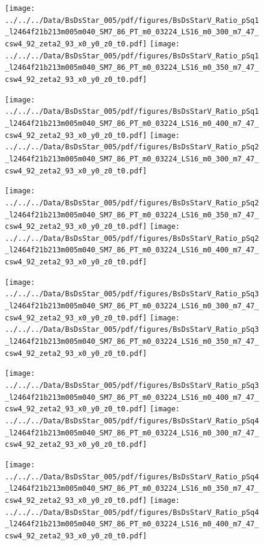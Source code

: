 \documentclass[a4paper,10pt]{article}
\begin{document}
\begin{figure}[p]
 \texttt{[image: ../../../Data/BsDsStar\_005/pdf/figures/BsDsStarV\_Ratio\_pSq1\_l2464f21b213m005m040\_SM7\_86\_PT\_m0\_03224\_LS16\_m0\_300\_m7\_47\_csw4\_92\_zeta2\_93\_x0\_y0\_z0\_t0.pdf]} 
 \texttt{[image: ../../../Data/BsDsStar\_005/pdf/figures/BsDsStarV\_Ratio\_pSq1\_l2464f21b213m005m040\_SM7\_86\_PT\_m0\_03224\_LS16\_m0\_350\_m7\_47\_csw4\_92\_zeta2\_93\_x0\_y0\_z0\_t0.pdf]} 
 \end{figure}
\begin{figure}[p]
 \texttt{[image: ../../../Data/BsDsStar\_005/pdf/figures/BsDsStarV\_Ratio\_pSq1\_l2464f21b213m005m040\_SM7\_86\_PT\_m0\_03224\_LS16\_m0\_400\_m7\_47\_csw4\_92\_zeta2\_93\_x0\_y0\_z0\_t0.pdf]} 
 \texttt{[image: ../../../Data/BsDsStar\_005/pdf/figures/BsDsStarV\_Ratio\_pSq2\_l2464f21b213m005m040\_SM7\_86\_PT\_m0\_03224\_LS16\_m0\_300\_m7\_47\_csw4\_92\_zeta2\_93\_x0\_y0\_z0\_t0.pdf]} 
 \end{figure}
\begin{figure}[p]
 \texttt{[image: ../../../Data/BsDsStar\_005/pdf/figures/BsDsStarV\_Ratio\_pSq2\_l2464f21b213m005m040\_SM7\_86\_PT\_m0\_03224\_LS16\_m0\_350\_m7\_47\_csw4\_92\_zeta2\_93\_x0\_y0\_z0\_t0.pdf]} 
 \texttt{[image: ../../../Data/BsDsStar\_005/pdf/figures/BsDsStarV\_Ratio\_pSq2\_l2464f21b213m005m040\_SM7\_86\_PT\_m0\_03224\_LS16\_m0\_400\_m7\_47\_csw4\_92\_zeta2\_93\_x0\_y0\_z0\_t0.pdf]} 
 \end{figure}
\clearpage
\begin{figure}[p]
 \texttt{[image: ../../../Data/BsDsStar\_005/pdf/figures/BsDsStarV\_Ratio\_pSq3\_l2464f21b213m005m040\_SM7\_86\_PT\_m0\_03224\_LS16\_m0\_300\_m7\_47\_csw4\_92\_zeta2\_93\_x0\_y0\_z0\_t0.pdf]} 
 \texttt{[image: ../../../Data/BsDsStar\_005/pdf/figures/BsDsStarV\_Ratio\_pSq3\_l2464f21b213m005m040\_SM7\_86\_PT\_m0\_03224\_LS16\_m0\_350\_m7\_47\_csw4\_92\_zeta2\_93\_x0\_y0\_z0\_t0.pdf]} 
 \end{figure}
\begin{figure}[p]
 \texttt{[image: ../../../Data/BsDsStar\_005/pdf/figures/BsDsStarV\_Ratio\_pSq3\_l2464f21b213m005m040\_SM7\_86\_PT\_m0\_03224\_LS16\_m0\_400\_m7\_47\_csw4\_92\_zeta2\_93\_x0\_y0\_z0\_t0.pdf]} 
 \texttt{[image: ../../../Data/BsDsStar\_005/pdf/figures/BsDsStarV\_Ratio\_pSq4\_l2464f21b213m005m040\_SM7\_86\_PT\_m0\_03224\_LS16\_m0\_300\_m7\_47\_csw4\_92\_zeta2\_93\_x0\_y0\_z0\_t0.pdf]} 
 \end{figure}
\begin{figure}[p]
 \texttt{[image: ../../../Data/BsDsStar\_005/pdf/figures/BsDsStarV\_Ratio\_pSq4\_l2464f21b213m005m040\_SM7\_86\_PT\_m0\_03224\_LS16\_m0\_350\_m7\_47\_csw4\_92\_zeta2\_93\_x0\_y0\_z0\_t0.pdf]} 
 \texttt{[image: ../../../Data/BsDsStar\_005/pdf/figures/BsDsStarV\_Ratio\_pSq4\_l2464f21b213m005m040\_SM7\_86\_PT\_m0\_03224\_LS16\_m0\_400\_m7\_47\_csw4\_92\_zeta2\_93\_x0\_y0\_z0\_t0.pdf]} 
 \end{figure}
\end{document}
